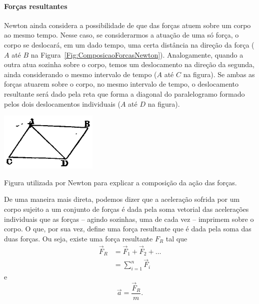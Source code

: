 \paragraph{Forças resultantes}

Newton ainda considera a possibilidade de que das forças atuem sobre um corpo ao mesmo tempo. Nesse caso, se considerarmos a atuação de uma só força, o corpo se deslocará, em um dado tempo, uma certa distância na direção da força ($A$ até $B$ na Figura~\ref{Fig:ComposicaoForcasNewton}). Analogamente, quando a outra atua sozinha sobre o corpo, temos um deslocamento na direção da segunda, ainda considerando o mesmo intervalo de tempo ($A$ até $C$ na figura). Se ambas as forças atuarem sobre o corpo, no mesmo intervalo de tempo, o deslocamento resultante será dado pela reta que forma a diagonal do paralelogramo formado pelos dois deslocamentos individuais ($A$ até $D$ na figura).

\begin{marginfigure}
\centering
\includegraphics[width= 0.7\linewidth]{Fig/177px-Principia1846-084.png}
\caption{Figura utilizada por Newton para explicar a composição da ação das forças.\label{Fig:ComposicaoForcasNewton}}
\end{marginfigure}

De uma maneira mais direta, podemos dizer que a aceleração sofrida por um corpo sujeito a um conjunto de forças é dada pela soma vetorial das acelerações individuais que as forças -- agindo sozinhas, uma de cada vez -- imprimem sobre o corpo. O que, por sua vez, define uma força resultante que é dada pela soma das duas forças. Ou seja, existe uma força resultante $F_R$ tal que
\begin{align}
    \vec{F}_R &= \vec{F}_1 + \vec{F}_2 + \dots \\
    &= \sum_{i = 1}^n \vec{F}_i
\end{align}
%
e
\begin{equation}
    \vec{a} =\frac{\vec{F}_R}{m}.
\end{equation}

